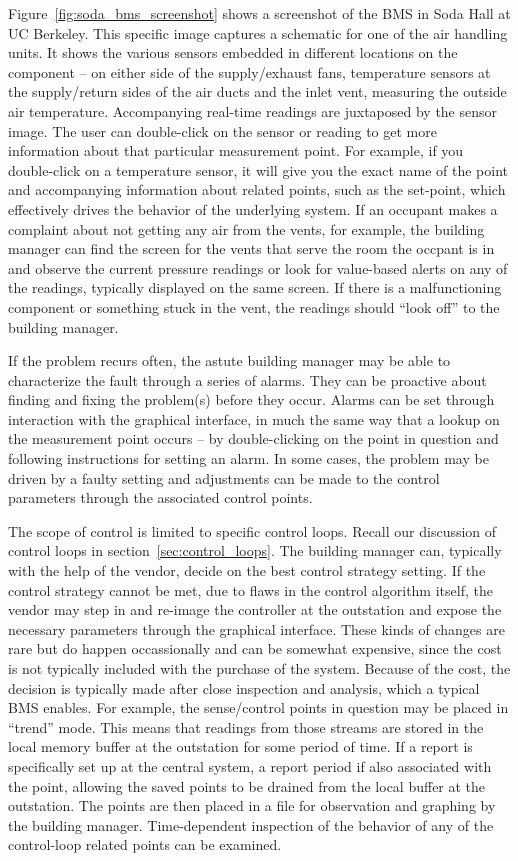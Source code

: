 Figure~\ref{fig:soda_bms_screenshot} shows a screenshot of the BMS in Soda Hall at UC Berkeley.  This specific image
captures a schematic for one of the air handling units.  It shows the various sensors embedded in different locations
on the component -- on either side of the supply/exhaust fans, temperature sensors at the supply/return sides of the
air ducts and the inlet vent, measuring the outside air temperature.  Accompanying real-time readings are juxtaposed
by the sensor image.  The user can double-click on the sensor or reading to get more information about that particular 
measurement point.  For example, if you double-click on a temperature sensor, it will give you the exact name of the 
point and accompanying information about related points, such as the set-point, which effectively drives the behavior of 
the underlying system.  If an occupant makes a complaint about not getting any air from the vents, for example, the 
building manager can find the screen for the vents that serve the room the occpant is in and observe the current
pressure readings or look for value-based alerts on any of the readings, typically displayed on the same screen.
If there is a malfunctioning component or something stuck in the vent, the readings should ``look off'' to the building 
manager.

If the problem recurs often, the astute building manager may be able to characterize the fault through a series of alarms.
They can be proactive about finding and fixing the problem(s) before they occur.  Alarms can be set through interaction
with the graphical interface, in much the same way that a lookup on the measurement point occurs -- by double-clicking on 
the point in question and following instructions for setting an alarm.  In some cases, the problem may be driven 
by a faulty setting and adjustments can be made to the control parameters through the associated control points.

The scope of control is limited to specific control loops.  Recall our discussion of control loops in section~\ref{sec:control_loops}.
The building manager can, typically with the help of the vendor, decide on the best control strategy setting.  If the control
strategy cannot be met, due to flaws in the control algorithm itself, the vendor may step in and re-image the controller
at the outstation and expose the necessary parameters through the graphical interface.  These kinds of changes are rare
but do happen occassionally and can be somewhat expensive, since the cost is not typically included with the purchase
of the system.  Because of the cost, the decision is typically made after close inspection and analysis, which a typical BMS
enables.  For example, the sense/control points in question may be placed in ``trend'' mode.  This means that readings
from those streams are stored in the local memory buffer at the outstation for some period of time.  If a report is specifically
set up at the central system, a report period if also associated with the point, allowing the saved points to be drained
from the local buffer at the outstation.  The points are then placed in a file for observation and graphing by the 
building manager.  Time-dependent inspection of the behavior of any of the control-loop related points can be examined.


